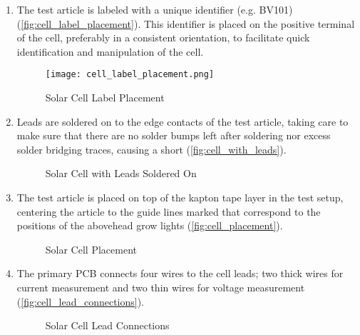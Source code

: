 \begin{enumerate}
    \item The test article is labeled with a unique identifier (e.g. BV101)
    (\autoref{fig:cell_label_placement}). This identifier is placed on the
    positive terminal of the cell, preferably in a consistent orientation, to
    facilitate quick identification and manipulation of the cell.

    \begin{figure}[!htbp]
        \texttt{[image: cell\_label\_placement.png]}
        \caption{Solar Cell Label Placement}
        \label{fig:cell_label_placement}
    \end{figure}

    \item Leads are soldered on to the edge contacts of the test article, taking
    care to make sure that there are no solder bumps left after soldering nor
    excess solder bridging traces, causing a short
    (\autoref{fig:cell_with_leads}).

    \begin{figure}[!htbp]
        \caption{Solar Cell with Leads Soldered On}
        \label{fig:cell_with_leads}
    \end{figure}

    \item The test article is placed on top of the kapton tape layer in the test
    setup, centering the article to the guide lines marked that correspond to
    the positions of the abovehead grow lights (\autoref{fig:cell_placement}).

    \begin{figure}[!htbp]
        \caption{Solar Cell Placement}
        \label{fig:cell_placement}
    \end{figure}

    \item The primary \ac{PCB} connects four wires to the cell leads; two thick
    wires for current measurement and two thin wires for voltage measurement
    (\autoref{fig:cell_lead_connections}).

    \begin{figure}[!htbp]
        \caption{Solar Cell Lead Connections}
        \label{fig:cell_lead_connections}
    \end{figure}


\end{enumerate}
